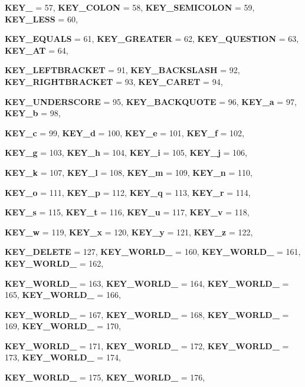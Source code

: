 \begin{DoxyCompactItemize}
{\bfseries KEY\_} =  57, 
{\bfseries KEY\_\-COLON} =  58, 
{\bfseries KEY\_\-SEMICOLON} =  59, 
{\bfseries KEY\_\-LESS} =  60, 
\par
{\bfseries KEY\_\-EQUALS} =  61, 
{\bfseries KEY\_\-GREATER} =  62, 
{\bfseries KEY\_\-QUESTION} =  63, 
{\bfseries KEY\_\-AT} =  64, 
\par
{\bfseries KEY\_\-LEFTBRACKET} =  91, 
{\bfseries KEY\_\-BACKSLASH} =  92, 
{\bfseries KEY\_\-RIGHTBRACKET} =  93, 
{\bfseries KEY\_\-CARET} =  94, 
\par
{\bfseries KEY\_\-UNDERSCORE} =  95, 
{\bfseries KEY\_\-BACKQUOTE} =  96, 
{\bfseries KEY\_\-a} =  97, 
{\bfseries KEY\_\-b} =  98, 
\par
{\bfseries KEY\_\-c} =  99, 
{\bfseries KEY\_\-d} =  100, 
{\bfseries KEY\_\-e} =  101, 
{\bfseries KEY\_\-f} =  102, 
\par
{\bfseries KEY\_\-g} =  103, 
{\bfseries KEY\_\-h} =  104, 
{\bfseries KEY\_\-i} =  105, 
{\bfseries KEY\_\-j} =  106, 
\par
{\bfseries KEY\_\-k} =  107, 
{\bfseries KEY\_\-l} =  108, 
{\bfseries KEY\_\-m} =  109, 
{\bfseries KEY\_\-n} =  110, 
\par
{\bfseries KEY\_\-o} =  111, 
{\bfseries KEY\_\-p} =  112, 
{\bfseries KEY\_\-q} =  113, 
{\bfseries KEY\_\-r} =  114, 
\par
{\bfseries KEY\_\-s} =  115, 
{\bfseries KEY\_\-t} =  116, 
{\bfseries KEY\_\-u} =  117, 
{\bfseries KEY\_\-v} =  118, 
\par
{\bfseries KEY\_\-w} =  119, 
{\bfseries KEY\_\-x} =  120, 
{\bfseries KEY\_\-y} =  121, 
{\bfseries KEY\_\-z} =  122, 
\par
{\bfseries KEY\_\-DELETE} =  127, 
{\bfseries KEY\_\-WORLD\_} =  160, 
{\bfseries KEY\_\-WORLD\_} =  161, 
{\bfseries KEY\_\-WORLD\_} =  162, 
\par
{\bfseries KEY\_\-WORLD\_} =  163, 
{\bfseries KEY\_\-WORLD\_} =  164, 
{\bfseries KEY\_\-WORLD\_} =  165, 
{\bfseries KEY\_\-WORLD\_} =  166, 
\par
{\bfseries KEY\_\-WORLD\_} =  167, 
{\bfseries KEY\_\-WORLD\_} =  168, 
{\bfseries KEY\_\-WORLD\_} =  169, 
{\bfseries KEY\_\-WORLD\_} =  170, 
\par
{\bfseries KEY\_\-WORLD\_} =  171, 
{\bfseries KEY\_\-WORLD\_} =  172, 
{\bfseries KEY\_\-WORLD\_} =  173, 
{\bfseries KEY\_\-WORLD\_} =  174, 
\par
{\bfseries KEY\_\-WORLD\_} =  175, 
{\bfseries KEY\_\-WORLD\_} =  176, 

\end{DoxyCompactItemize}

